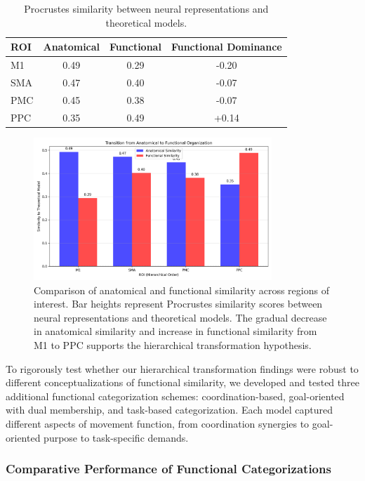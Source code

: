 \documentclass{article}
\begin{document}
\begin{table}[h]
\centering
\small
\begin{tabular}{|l|c|c|c|}
\hline
\textbf{ROI} & \textbf{Anatomical} & \textbf{Functional} & \textbf{Functional Dominance} \\
\hline
M1 & 0.49 & 0.29 & -0.20 \\
SMA & 0.47 & 0.40 & -0.07 \\
PMC & 0.45 & 0.38 & -0.07 \\
PPC & 0.35 & 0.49 & +0.14 \\
\hline
\end{tabular}
\caption{Procrustes similarity between neural representations and theoretical models.}
\label{tab:procrustes}
\end{table}

\begin{figure}[!htbp]
\centering
\includegraphics[width=0.8\textwidth]{results/anatomical_functional_similarity.png}
\caption{Comparison of anatomical and functional similarity across regions of interest. Bar heights represent Procrustes similarity scores between neural representations and theoretical models. The gradual decrease in anatomical similarity and increase in functional similarity from M1 to PPC supports the hierarchical transformation hypothesis.}
\label{fig:procrustes_comparison}
\end{figure}

To rigorously test whether our hierarchical transformation findings were robust to different conceptualizations of functional similarity, we developed and tested three additional functional categorization schemes: coordination-based, goal-oriented with dual membership, and task-based categorization. Each model captured different aspects of movement function, from coordination synergies to goal-oriented purpose to task-specific demands.

\subsubsection{Comparative Performance of Functional Categorizations}
\end{document}
